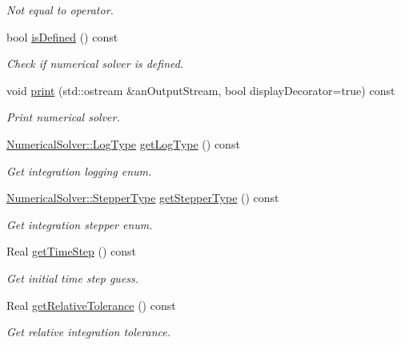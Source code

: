 \begin{DoxyCompactItemize}
\begin{DoxyCompactList}\small\item\em Not equal to operator. \end{DoxyCompactList}\item 
bool \hyperlink{classostk_1_1astro_1_1_numerical_solver_a936f93694a47c4ebca82fb6e233b8b4a}{is\+Defined} () const
\begin{DoxyCompactList}\small\item\em Check if numerical solver is defined. \end{DoxyCompactList}\item 
void \hyperlink{classostk_1_1astro_1_1_numerical_solver_a8572e8bc097feb35d7e7ba293ffd511a}{print} (std\+::ostream \&an\+Output\+Stream, bool display\+Decorator=true) const
\begin{DoxyCompactList}\small\item\em Print numerical solver. \end{DoxyCompactList}\item 
\hyperlink{classostk_1_1astro_1_1_numerical_solver_a23e9e3f7d630f3097b4cbd91d9a2aa4c}{Numerical\+Solver\+::\+Log\+Type} \hyperlink{classostk_1_1astro_1_1_numerical_solver_ad0403195d44325cc71a8a19359640329}{get\+Log\+Type} () const
\begin{DoxyCompactList}\small\item\em Get integration logging enum. \end{DoxyCompactList}\item 
\hyperlink{classostk_1_1astro_1_1_numerical_solver_afb80f81b2c3cc1d356b0b4749e45b947}{Numerical\+Solver\+::\+Stepper\+Type} \hyperlink{classostk_1_1astro_1_1_numerical_solver_adb327bb6a9dc0fc4ab8fca57030b51e6}{get\+Stepper\+Type} () const
\begin{DoxyCompactList}\small\item\em Get integration stepper enum. \end{DoxyCompactList}\item 
Real \hyperlink{classostk_1_1astro_1_1_numerical_solver_a1caf9f97b27630a5baa4444e76fe9ad4}{get\+Time\+Step} () const
\begin{DoxyCompactList}\small\item\em Get initial time step guess. \end{DoxyCompactList}\item 
Real \hyperlink{classostk_1_1astro_1_1_numerical_solver_acdd27776ff2d4fca2bb6cb4fbb94b547}{get\+Relative\+Tolerance} () const
\begin{DoxyCompactList}\small\item\em Get relative integration tolerance. \end{DoxyCompactList}\item 

\end{DoxyCompactItemize}
